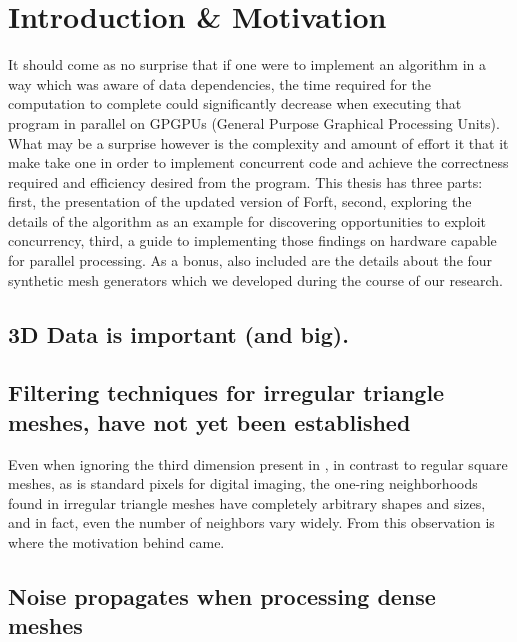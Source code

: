 \chapter{Introduction \& Motivation}
\label{ch1}
It should come as no surprise that if one were to implement an algorithm in a way which was aware of data dependencies, the time required for the computation to complete could significantly decrease when executing that program in parallel on GPGPUs (General Purpose Graphical Processing Units).  What may be a surprise however is the complexity and amount of effort it that it make take one in order to implement concurrent code and achieve the correctness required and efficiency desired from the program. This thesis has three parts: first, the presentation of the updated version of Forf{t}, second, exploring the details of the algorithm as an example for discovering opportunities to exploit concurrency, third, a guide to implementing those findings on hardware capable for parallel processing. As a bonus, also included are the details about the four synthetic mesh generators which we developed during the course of our research.
 
%
%
%
\section{3D Data is important (and big).} 

\section{Filtering techniques for irregular triangle meshes, have not yet been established}
Even when ignoring the third dimension present in \tdd{}, in contrast to regular square meshes, as is standard pixels for digital imaging, the one-ring neighborhoods found in irregular triangle meshes have completely arbitrary shapes and sizes, and in fact, even the number of neighbors vary widely. From this observation is where the motivation behind  came.
%
\section{Noise propagates when processing dense meshes}

